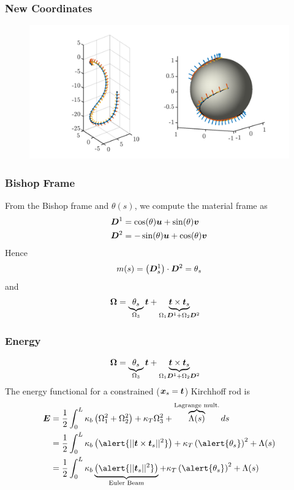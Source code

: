 \documentclass{beamer}
\begin{document}
\begin{frame}
\frametitle{New Coordinates}
\begin{figure}
\includegraphics[width=1\textwidth]{./Cartoons/Bishop_Sphere.png}
\end{figure}
\end{frame}

\begin{frame}
\frametitle{Bishop Frame}
From the Bishop frame and $\theta(s)$, we compute the material frame as
\begin{align}
\boldsymbol{D}^{1} &= \cos (\theta) \boldsymbol{u} + \sin(\theta) \boldsymbol{v} \\
\boldsymbol{D}^{2} &= -\sin (\theta) \boldsymbol{u} + \cos(\theta) \boldsymbol{v}
\end{align}
Hence
\[
m(s) = \left( \boldsymbol{D}^{1}_{s} \right) \cdot \boldsymbol{D}^{2} = \theta_s
\]
and
\begin{align}
\boldsymbol{\Omega} &= \underbrace{\theta_s}_{\Omega_3} \boldsymbol{t} + \underbrace{\boldsymbol{t} \times  \boldsymbol{t}_{s}}_{\Omega_1 \boldsymbol{D}^{1} +  \Omega_2 \boldsymbol{D}^{2}}
\end{align}
\end{frame}

\begin{frame}
\frametitle{Energy}
\alert<1->{
\begin{align*}
\boldsymbol{\Omega} &= \underbrace{\theta_s}_{\Omega_3} \boldsymbol{t} + \underbrace{\boldsymbol{t} \times  \boldsymbol{t}_{s}}_{\Omega_1 \boldsymbol{D}^{1} +  \Omega_2 \boldsymbol{D}^{2}}
\end{align*}
}
The energy functional for a constrained ($\boldsymbol{x}_s = \boldsymbol{t}$) Kirchhoff rod is 
\begin{align}
\M{E} &= \frac{1}{2} \displaystyle \int_{0}^{L} \kappa_b \left(  \Omega_1^{2} +  \Omega_2^{2}  \right) +  \kappa_T \Omega_3^{2}  + \overbrace{\Lambda(s) }^{\text{Lagrange mult.}}  ds \\
&= \frac{1}{2} \displaystyle \int_{0}^{L} \kappa_b \left(  \alert{|| \V{t} \times  \V{t}_{s} ||^2} \right) +  \kappa_T \left(\alert{\theta_s} \right)^{2}  + \Lambda(s)  \\
&= \frac{1}{2} \displaystyle \int_{0}^{L} \kappa_b \underbrace{\left(  \alert{|| \V{t}_{s} ||^2} \right)}_{\text{Euler Beam}} +  \kappa_T \left(\alert{\theta_s} \right)^{2}  + \Lambda(s) 
\end{align}

\end{frame}
\end{document}
